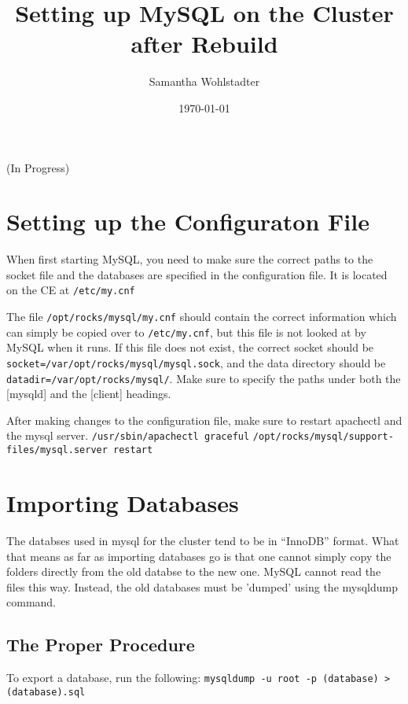 \documentclass[12pt]{article}
\begin{document}
\title{Setting up MySQL on the Cluster after Rebuild}
\date{\today}
\author{Samantha Wohlstadter}
\thispagestyle{empty}
\maketitle

(In Progress)

\section{Setting up the Configuraton File}

 When first starting MySQL, you need to make sure the correct paths to the socket file and the databases are specified in the configuration file. It is located on the CE at {\tt /etc/my.cnf}

 The file {\tt /opt/rocks/mysql/my.cnf} should contain the correct information which can simply be copied over to {\tt /etc/my.cnf}, but this file is not looked at by MySQL when it runs. If this file does not exist, the correct socket should be {\tt socket=/var/opt/rocks/mysql/mysql.sock}, and the data directory should be {\tt datadir=/var/opt/rocks/mysql/}. Make sure to specify the paths under both the [mysqld] and the [client] headings.

 After making changes to the configuration file, make sure to restart apachectl and the mysql server.
    {\tt /usr/sbin/apachectl graceful}
    {\tt /opt/rocks/mysql/support-files/mysql.server restart }

\section{Importing Databases}
The databses used in mysql for the cluster tend to be in ``InnoDB'' format. What that means as far as importing databases go is that one cannot simply copy the folders directly from the old databse to the new one. MySQL cannot read the files this way. Instead, the old databases must be 'dumped' using the mysqldump command.
\subsection{The Proper Procedure}
To export a database, run the following:
    {\tt mysqldump -u root -p (database) > (database).sql}
\end{document}
